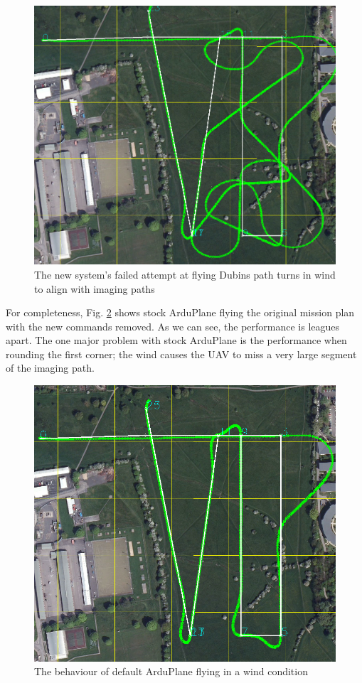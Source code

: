 \begin{figure}[htbp!] 
\centering    
\includegraphics[width=\textwidth]{5Wind_32_20}
\caption[An attempt at flying Dubins path turns in wind]{The new system's failed attempt at flying Dubins path turns in wind to align with imaging paths}
\label{fig:3220withwind}
\end{figure} 

For completeness, Fig. \ref{fig:default5wind} shows stock ArduPlane flying the original mission plan with the new commands removed. As we can see, the performance is leagues apart. The one major problem with stock ArduPlane is the performance when rounding the first corner; the wind causes the UAV to miss a very large segment of the imaging path.

\begin{figure}[htbp!] 
\centering    
\includegraphics[width=\textwidth]{Default_5wind}
\caption[Stock ArduPlane flying in wind]{The behaviour of default ArduPlane flying in a wind condition}
\label{fig:default5wind}
\end{figure} 

